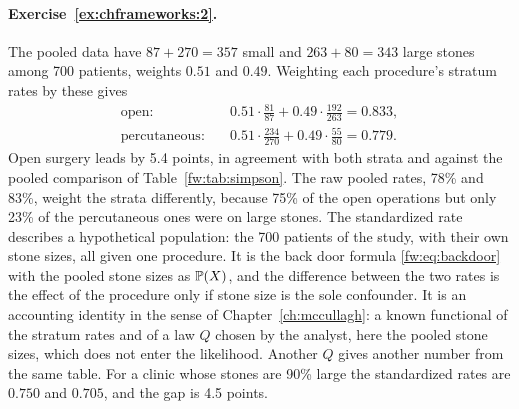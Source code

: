 \paragraph{Exercise~\ref{ex:chframeworks:2}.} The pooled data have $87 + 270 = 357$ small and $263 + 80 = 343$ large stones among 700 patients, weights $0.51$ and $0.49$. Weighting each procedure's stratum rates by these gives
\begin{align*}
\text{open:} \quad & 0.51\cdot\frac{81}{87} + 0.49\cdot\frac{192}{263} = 0.833,\\
\text{percutaneous:} \quad & 0.51\cdot\frac{234}{270} + 0.49\cdot\frac{55}{80} = 0.779.
\end{align*}
Open surgery leads by 5.4 points, in agreement with both strata and against the pooled comparison of Table~\ref{fw:tab:simpson}. The raw pooled rates, 78\% and 83\%, weight the strata differently, because 75\% of the open operations but only 23\% of the percutaneous ones were on large stones. The standardized rate describes a hypothetical population: the 700 patients of the study, with their own stone sizes, all given one procedure. It is the back door formula \eqref{fw:eq:backdoor} with the pooled stone sizes as $\mathbb{P}(X)$, and the difference between the two rates is the effect of the procedure only if stone size is the sole confounder. It is an accounting identity in the sense of Chapter~\ref{ch:mccullagh}: a known functional of the stratum rates and of a law $Q$ chosen by the analyst, here the pooled stone sizes, which does not enter the likelihood. Another $Q$ gives another number from the same table. For a clinic whose stones are 90\% large the standardized rates are $0.750$ and $0.705$, and the gap is 4.5 points.

